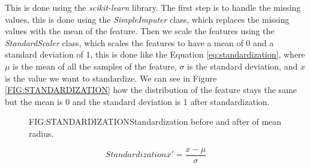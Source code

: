 This is done using the \textit{scikit-learn} library. The first step is to handle the missing values, this is done using the \textit{SimpleImputer} class, which replaces the missing values with the mean of the feature. Then we scale the features using the \textit{StandardScaler} class, which scales the features to have a mean of 0 and a standard deviation of 1, this is done like the Equation \ref{eq:standardization}, where $\mu$ is the mean of all the samples of the feature, $\sigma$ is the standard deviation, and $x$ is the value we want to standardize. We can see in Figure \ref{FIG:STANDARDIZATION} how the distribution of the feature stays the same but the mean is 0 and the standard deviation is 1 after standardization.

\begin{figure}[Standardization]{FIG:STANDARDIZATION}{Standardization before and after of mean radius.}
\end{figure}

\begin{equation}[eq:standardization]{Standardization}
    \boxed{x' = \frac{x - \mu}{\sigma}}
\end{equation}

